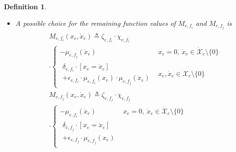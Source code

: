 \documentclass[journal]{IEEEtran}
\newtheorem{definition}[theorem]{Definition}
\newcommand{\set}[1]{\mathcal{#1}}
\newcommand{\xe}{ x_{e} }
\newcommand{\defeq}{ \triangleq }
\newcommand{\LCTset}[1]{\mathring{\mathcal{#1}}}
\newcommand{\LCT}[1]{ \mathring{#1} }
\newcommand{\efi}{ e,f_i }
\newcommand{\efj}{ e,f_j }
\newcommand{\LCTsetxe}{ \LCTset{X}_{e} }
\begin{document}
\begin{definition}
\begin{enumerate}
\begin{itemize}
            \item A possible choice for the remaining function values of $M_{\efi}$ and
                  $M_{\efj}$ is
                  \begin{align}
                    \begin{aligned}
                       & M_{\efi}(\xe,\LCT{x}_e)
                      \defeq \zeta_{\efi}
                      \cdot
                      \chi_{\efi}
                      \\&\cdot
                      \begin{cases}
                        - \mu_{\efj}(\LCT{x}_e)
                         & \!\!\!\!\!\!\!\! x_e = 0, \
                        \LCT{x}_e \in \LCTsetxe\setminus\{0\}                             \\[0.2cm]
                        \begin{array}{l}
                          \delta_{\efi}
                          \cdot
                          [x_e \!=\! \LCT{x}_e]
                          \\
                          +
                          \epsilon_{\efi}
                          \cdot
                          \mu_{\efi}(\xe)
                          \cdot
                          \mu_{\efj}(\LCT{x}_e)
                        \end{array}
                         & \!\!\!\!\!\!\!\! x_e,\LCT{x}_e \in \set{X}_e \setminus \{ 0 \}
                      \end{cases}
                      \\
                       & M_{\efj}(\xe,\LCT{x}_e)
                      \defeq \zeta_{\efj}
                      \cdot
                      \chi_{\efj}
                      \\&\cdot\begin{cases}
                                - \mu_{\efi}(\LCT{x}_e)
                                 & \!\!\!\!\!\!\!\! x_e = 0, \
                                \LCT{x}_e \in \LCTsetxe\setminus\{0\}                             \\[0.2cm]
                                \begin{array}{l}
                                  \delta_{\efj}
                                  \cdot
                                  [x_e \!=\! \LCT{x}_e]
                                  \\+
                                  \epsilon_{\efj}
                                  \cdot
                                  \mu_{\efj}(\xe)

\end{array}
\end{cases}
\end{aligned}
\end{align}
\end{itemize}
\end{enumerate}
\end{definition}
\end{document}
